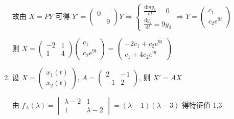 \begin{enumerate}
                   故由 \( X = P Y \) 可得 \( Y' = \begin{pmatrix}
                       0 &   \\
                         & 9
                   \end{pmatrix} Y \Rightarrow \begin{cases}
                       \frac{\mathrm{d}my_{1}}{\mathrm{d}t} = 0 \\
                       \frac{\mathrm{d}y_{2}}{\mathrm{d}t} = 9y_{2}
                   \end{cases} \Rightarrow Y = \begin{pmatrix}
                       c_{1} \\
                       c_{2}e^{9t}
                   \end{pmatrix} \)

                   则 \( X = \begin{pmatrix}
                       -2 & 1 \\
                       1  & 4
                   \end{pmatrix}\begin{pmatrix}
                       c_{1} \\
                       c_{2}e^{9t}
                   \end{pmatrix} = \begin{pmatrix}
                       -2c_{1} + c_{2}e^{9t} \\
                       c_{1} + 4c_{2}e^{9t}
                   \end{pmatrix} \)
             \item %
                   设 \( X = \begin{pmatrix}
                       x_{1}(t) \\
                       x_{2}(t)
                   \end{pmatrix} \), \( A = \begin{pmatrix}
                       2  & -1 \\
                       -1 & 2
                   \end{pmatrix} \), 则 \( X' = AX \)

                   由 \( f_{A}(\lambda) = \begin{vmatrix}
                       \lambda-2 & 1         \\
                       1         & \lambda-2
                   \end{vmatrix} = (\lambda-1)(\lambda-3) \) 得特征值 1,3


\end{enumerate}
